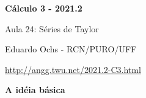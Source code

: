 \documentclass[oneside,12pt]{article}
\begin{document}
%



\def\u#1{\par{\footnotesize \url{#1}}}

\def\drafturl{http://angg.twu.net/LATEX/2021-2-C3.pdf}
\def\drafturl{http://angg.twu.net/2021.2-C3.html}
\def\draftfooter{\tiny \href{\drafturl}{\jobname{}} \ColorBrown{\shorttoday{} \hours}}

\def\derivs{\mathsf{derivs}}
\def\frt#1{\frac{f^{(#1)}(0)}{#1!}}



%

\thispagestyle{empty}

\begin{center}

\vspace*{1.2cm}

{\bf \Large Cálculo 3 - 2021.2}

\bsk

Aula 24: Séries de Taylor

\bsk

Eduardo Ochs - RCN/PURO/UFF

\url{http://angg.twu.net/2021.2-C3.html}

\end{center}

\newpage


{\bf A idéia básica}
\end{document}

